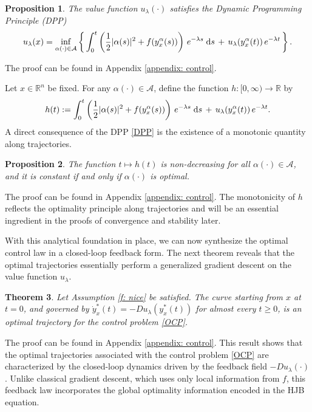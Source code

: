 \documentclass[12pt]{amsart}
\newcommand{\D}[1]{\mbox{\rm #1}}
\newcommand{\dd}{\D{d}}
\numberwithin{equation}{section}
\theoremstyle{plain}
\newtheorem{theorem}{Theorem}[section]
\newtheorem{proposition}[theorem]{Proposition}
\begin{document}
\begin{proposition}\label{prop: DPP}
The value function $u_{\lambda}(\cdot)$ satisfies the Dynamic Programming Principle (DPP)
\begin{equation}\label{DPP}
    u_{\lambda}(x) = \inf\limits_{\alpha(\cdot)\in \mathcal{A}} \left\{\, \int_{0}^{t} \left(\frac{1}{2}|\alpha(s)|^{2} + f(y_{x}^{\alpha}(s))\right)\, e^{-\lambda s}\;\dd s \, + \, u_{\lambda}(y_{x}^{\alpha}(t))\,e^{-\lambda t} \,\right\}.
\end{equation}
\end{proposition}
The proof can be found in Appendix \ref{appendix: control}.

Let $x\in \mathbb{R}^{n}$ be fixed. For any $\alpha(\cdot)\in\mathcal{A}$, define the function $h:[0,\infty)\to \mathbb{R}$ by
\begin{equation*}
    h(t) := \int_{0}^{t} \left(\frac{1}{2}|\alpha(s)|^{2} + f(y_{x}^{\alpha}(s))\right)\, e^{-\lambda s}\;\dd s \, + \, u_{\lambda}(y_{x}^{\alpha}(t))\,e^{-\lambda t}.
\end{equation*}
A direct consequence of the DPP \eqref{DPP} is the existence of a monotonic quantity along trajectories.


\begin{proposition}\label{Prop: h}
The function $t\mapsto h(t)$ is non-decreasing for all $\alpha(\cdot)\in \mathcal{A}$, and it is constant if and only if $\alpha(\cdot)$ is optimal.
\end{proposition}

The proof can be found in Appendix \ref{appendix: control}. The monotonicity of $h$ reflects the optimality principle along trajectories and will be an essential ingredient in the proofs of convergence and stability later.

With this analytical foundation in place, we can now synthesize the optimal control law in a closed-loop feedback form. The next theorem reveals that the optimal trajectories essentially perform a generalized gradient descent on the value function $u_\lambda$.

\begin{theorem}\label{thm: opt cont}
Let Assumption \ref{f: nice} be satisfied. 
The curve starting from $x$ at $t=0$, and governed by $\dot{y}^{*}_{x}(t) = -Du_{\lambda}(y^{*}_{x}(t))$ for almost every $t\geq 0$, is an optimal trajectory for the control problem \eqref{OCP}.
\end{theorem}

The proof can be found in Appendix \ref{appendix: control}. This result shows that the optimal trajectories associated with the control problem \eqref{OCP} are characterized by the closed-loop dynamics driven by the feedback field $-D u_\lambda(\cdot)$. 
Unlike classical gradient descent, which uses only local information from $f$, this feedback law incorporates the global optimality information encoded in the HJB equation.
\end{document}
